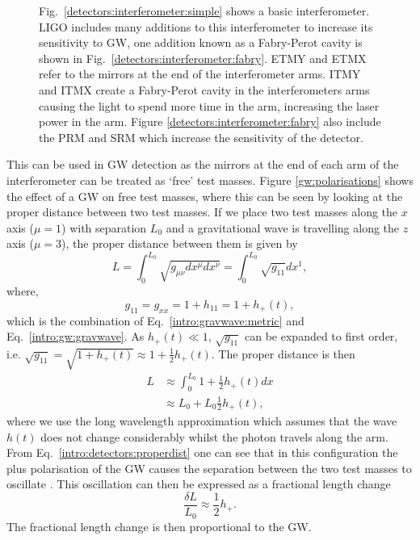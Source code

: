 \begin{figure}[hp]
    \caption[Basic layout of the \gls{LIGO}
detectors.]{Fig.~\ref{detectors:interferometer:simple} shows a basic
interferometer. \gls{LIGO} includes many additions to this interferometer to
increase its sensitivity to \gls{GW}, one addition known as a Fabry-Perot
cavity is shown in Fig.~\ref{detectors:interferometer:fabry}. \Gls{ETMY} and
\gls{ETMX} refer to the mirrors at the end of the interferometer arms.  \Gls{ITMY} and \gls{ITMX} create a Fabry-Perot cavity in the interferometers
arms causing the light to spend more time in the arm, increasing the laser power in the arm. Figure \ref{detectors:interferometer:fabry} also include the \gls{PRM} and \gls{SRM} which increase the sensitivity of the detector.}
\label{detectors:interferometer}
\end{figure}

This can be used in \gls{GW} detection
as the mirrors at the end of each arm of the interferometer can be treated as
`free' test masses.  Figure \ref{gw:polarisations} shows the effect of a
\gls{GW} on free test masses, where this can be seen by looking at the proper
distance between two test masses.  If we place two test masses along the $x$
axis ($\mu = 1$) with separation $L_0$ and a gravitational wave is travelling
along the $z$ axis ($\mu = 3$), the proper distance between them is given by
%
\begin{equation}
    L = \int_{0}^{L_0} \sqrt{g_{\mu \nu} dx^{\mu} dx^{\nu}}= \int_{0}^{L_0} \sqrt{g_{11}} dx^1,
\end{equation}
%
where,
\begin{equation}
    \label{intro:detectors:metricpertubation}
     g_{11} = g_{xx} = 1 + h_{11} = 1 + h_{+}(t),
\end{equation}
which is the combination of Eq.~\ref{intro:gravwave:metric} and Eq.~\ref{intro:gw:gravwave}.  As $h_{+}(t) \ll 1$, $\sqrt{g_{11}}$ can be expanded to first order, i.e.  $\sqrt{g_{11}} = \sqrt{1 +
h_{+}(t)} \approx 1 + \frac{1}{2}h_{+}(t)$.  The proper distance is then
%
\begin{equation}
    \label{intro:detectors:properdist}
    \begin{split}
     L &\approx \int_{0}^{L_0} 1 + \frac{1}{2}h_{+}(t) dx \\
      &\approx L_0 + L_0 \frac{1}{2}h_{+}(t),
    \end{split}
\end{equation}
%
where we use the long wavelength approximation which assumes that the wave
$h(t)$ does not change considerably whilst the photon travels along the arm.
From Eq.~\ref{intro:detectors:properdist} one can see that in this configuration the
plus polarisation of the \gls{GW} causes the separation between the
two test masses to oscillate \citep{flanagan2005BasicsGravitational}.  This
oscillation can then be expressed as a fractional length change
%
\begin{equation}
    \label{intro:detectors:fraclength}
    \frac{\delta L}{L_0} \approx \frac{1}{2} h_{+}.
\end{equation}
%
The fractional length change is then proportional to the \gls{GW}.


